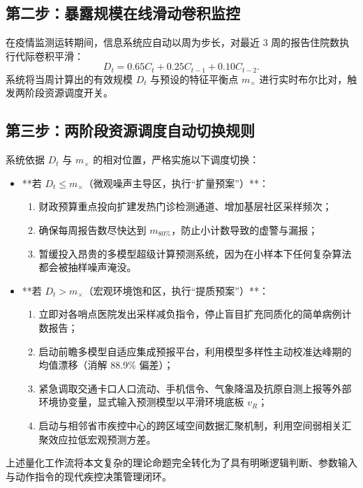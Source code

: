 \subsection{第二步：暴露规模在线滑动卷积监控}
在疫情监测运转期间，信息系统应自动以周为步长，对最近 3 周的报告住院数执行代际卷积平滑：
\begin{equation}
D_t = 0.65 C_t + 0.25 C_{t-1} + 0.10 C_{t-2}.
\end{equation}
系统将当周计算出的有效规模 $D_t$ 与预设的特征平衡点 $m_\times$ 进行实时布尔比对，触发两阶段资源调度开关。

\subsection{第三步：两阶段资源调度自动切换规则}
系统依据 $D_t$ 与 $m_\times$ 的相对位置，严格实施以下调度切换：
\begin{itemize}
    \item **若 $D_t \le m_\times$（微观噪声主导区，执行“扩量预案”）**：
    \begin{enumerate}[label=\alph*.]
        \item 财政预算重点投向扩建发热门诊检测通道、增加基层社区采样频次；
        \item 确保每周报告数尽快达到 $m_{80\%}$，防止小计数导致的虚警与漏报；
        \item 暂缓投入昂贵的多模型超级计算预测系统，因为在小样本下任何复杂算法都会被抽样噪声淹没。
    \end{enumerate}
    \item **若 $D_t > m_\times$（宏观环境饱和区，执行“提质预案”）**：
    \begin{enumerate}[label=\alph*.]
        \item 立即对各哨点医院发出采样减负指令，停止盲目扩充同质化的简单病例计数报告；
        \item 启动前瞻多模型自适应集成预报平台，利用模型多样性主动校准达峰期的均值漂移（消解 88.9\% 偏差）；
        \item 紧急调取交通卡口人口流动、手机信令、气象降温及抗原自测上报等外部环境协变量，显式输入预测模型以平滑环境底板 $v_R$；
        \item 启动与相邻省市疾控中心的跨区域空间数据汇聚机制，利用空间弱相关汇聚效应拉低宏观预测方差。
    \end{enumerate}
\end{itemize}

上述量化工作流将本文复杂的理论命题完全转化为了具有明晰逻辑判断、参数输入与动作指令的现代疾控决策管理闭环。
